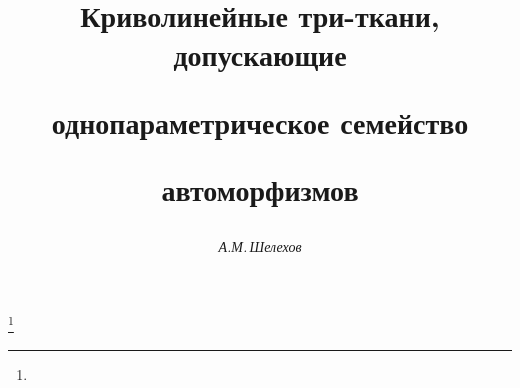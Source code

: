 

 


% 


\newcommand{\Ch}{\operatorname{Ch}} 


\newcommand{\tts}[1]{} 


 




\setcounter{page}{68} 












 


\author{\it А.М.\,Шелехов} 




\title{Криволинейные три-ткани, допускающие  


однопараметрическое семейство  


автоморфизмов} 


\thanks{} 


 


\date{} 




\pagestyle{plain} %


 




\maketitle 


\label{begin} 



